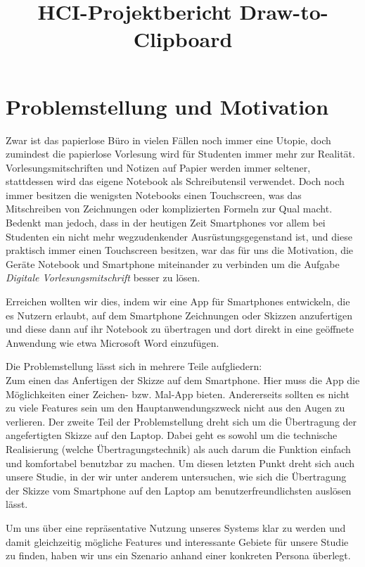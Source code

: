 \documentclass{chi-ext}
\title{HCI-Projektbericht Draw-to-Clipboard}
\author{
  \vspace{-1.5em} %
  \alignauthor{
  	\textbf{Constantin Gerstberger}\\
  	\email{constantin.gerstberger@gmail.com}
  }
  \vfil
  \alignauthor{
  	\textbf{Marcus Vetter}\\
  	\email{marcus.vetter@tum.de}
  }\alignauthor{
  	\textbf{Manfred Schmidbartl}\\
  	\email{m.schmidbartl@gmail.com}
  }  
  \vfil
  \alignauthor{
  	\textbf{Benjamin Schwartz}\\
  	\email{benjamin.schwartz@arcor.de}
  }\alignauthor{
  	\textbf{Sebastian Wöhrl}\\
  	\email{sebastian.woehrl@mytum.de}
  }
}
\begin{document}
\maketitle


\section{Problemstellung und Motivation}
Zwar ist das papierlose Büro in vielen Fällen noch immer eine Utopie, doch zumindest die papierlose Vorlesung wird für Studenten immer mehr zur Realität. Vorlesungsmitschriften und Notizen auf Papier werden immer seltener, stattdessen wird das eigene Notebook als Schreibutensil verwendet. Doch noch immer besitzen die wenigsten Notebooks einen Touchscreen, was das Mitschreiben von Zeichnungen oder komplizierten Formeln zur Qual macht. 
Bedenkt man jedoch, dass in der heutigen Zeit Smartphones vor allem bei Studenten ein nicht mehr wegzudenkender Ausrüstungsgegenstand ist, und diese praktisch immer einen Touchscreen besitzen, war das für uns die Motivation, die Geräte Notebook und Smartphone miteinander zu verbinden um die Aufgabe \textit{Digitale Vorlesungsmitschrift} besser zu lösen.

Erreichen wollten wir dies, indem wir eine App für Smartphones entwickeln, die es Nutzern erlaubt, auf dem Smartphone Zeichnungen oder Skizzen anzufertigen und diese dann auf ihr Notebook zu übertragen und dort direkt in eine geöffnete Anwendung wie etwa Microsoft Word einzufügen.


Die Problemstellung lässt sich in mehrere Teile aufgliedern:\\
Zum einen das Anfertigen der Skizze auf dem Smartphone. Hier muss die App die Möglichkeiten einer Zeichen- bzw. Mal-App bieten. Andererseits sollten es nicht zu viele Features sein um den Hauptanwendungszweck nicht aus den Augen zu verlieren.
Der zweite Teil der Problemstellung dreht sich um die Übertragung der angefertigten Skizze auf den Laptop. Dabei geht es sowohl um die technische Realisierung (welche Übertragungstechnik) als auch darum die Funktion einfach und komfortabel benutzbar zu machen.
Um diesen letzten Punkt dreht sich auch unsere Studie, in der wir unter anderem untersuchen, wie sich die Übertragung der Skizze vom Smartphone auf den Laptop am benutzerfreundlichsten auslösen lässt.

Um uns über eine repräsentative Nutzung unseres Systems klar zu werden und damit gleichzeitig mögliche Features und interessante Gebiete für unsere Studie zu finden, haben wir uns ein Szenario anhand einer konkreten Persona überlegt. 
\end{document}
